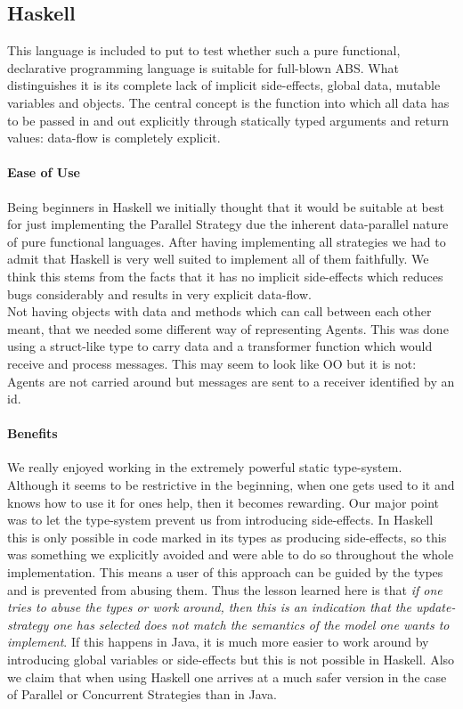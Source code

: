  
\subsection{Haskell}
This language is included to put to test whether such a pure functional, declarative programming language is suitable for full-blown ABS. What distinguishes it is its complete lack of implicit side-effects, global data, mutable variables and objects. The central concept is the function into which all data has to be passed in and out explicitly through statically typed arguments and return values: data-flow is completely explicit.

\paragraph{Ease of Use}
Being beginners in Haskell we initially thought that it would be suitable at best for just implementing the Parallel Strategy due the inherent data-parallel nature of pure functional languages. After having implementing all strategies we had to admit that Haskell is very well suited to implement all of them faithfully. We think this stems from the facts that it has no implicit side-effects which reduces bugs considerably and results in very explicit data-flow. \\

Not having objects with data and methods which can call between each other meant, that we needed some different way of representing Agents. This was done using a struct-like type to carry data and a transformer function which would receive and process messages. This may seem to look like OO but it is not: Agents are not carried around but messages are sent to a receiver identified by an id.

\paragraph{Benefits}
We really enjoyed working in the extremely powerful static type-system. Although it seems to be restrictive in the beginning, when one gets used to it and knows how to use it for ones help, then it becomes rewarding. Our major point was to let the type-system prevent us from introducing side-effects. In Haskell this is only possible in code marked in its types as producing side-effects, so this was something we explicitly avoided and were able to do so throughout the whole implementation. This means a user of this approach can be guided by the types and is prevented from abusing them. Thus the lesson learned here is that \textit{if one tries to abuse the types or work around, then this is an indication that the update-strategy one has selected does not match the semantics of the model one wants to implement}. If this happens in Java, it is much more easier to work around by introducing global variables or side-effects but this is not possible in Haskell. Also we claim that when using Haskell one arrives at a much safer version in the case of Parallel or Concurrent Strategies than in Java.\\

